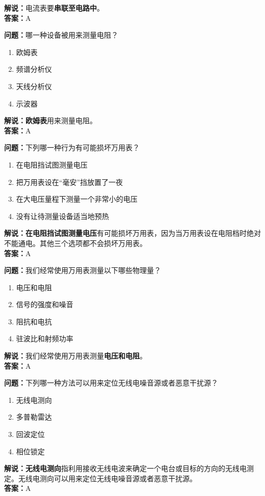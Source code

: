 \textbf{解说：}电流表要\textbf{串联至电路中}。\\\textbf{答案：}A%


\textbf{问题：}哪一种设备被用来测量电阻？

\begin{enumerate}[label=\Alph*), leftmargin=1cm]
	\item 欧姆表
	\item 频谱分析仪
	\item 天线分析仪
	\item 示波器
\end{enumerate}

\textbf{解说：欧姆表}用来测量电阻。\\\textbf{答案：}A


\textbf{问题：}下列哪一种行为有可能损坏万用表？

\begin{enumerate}[label=\Alph*), leftmargin=1cm]
	\item 在电阻挡试图测量电压
	\item 把万用表设在“毫安”挡放置了一夜
	\item 在大电压量程下测量一个非常小的电压
	\item 没有让待测量设备适当地预热
\end{enumerate}

\textbf{解说：在电阻挡试图测量电压}有可能损坏万用表，因为当万用表设在电阻档时绝对不能通电。其他三个选项都不会损坏万用表。\\\textbf{答案：}A%

\textbf{问题：}我们经常使用万用表测量以下哪些物理量？

\begin{enumerate}[label=\Alph*), leftmargin=1cm]
	\item 电压和电阻
	\item 信号的强度和噪音
	\item 阻抗和电抗
	\item 驻波比和射频功率
\end{enumerate}

\textbf{解说：}我们经常使用万用表测量\textbf{电压和电阻}。\\\textbf{答案：}A%


\textbf{问题：}下列哪一种方法可以用来定位无线电噪音源或者恶意干扰源？

\begin{enumerate}[label=\Alph*), leftmargin=1cm]
	\item 无线电测向
	\item 多普勒雷达
	\item 回波定位
	\item 相位锁定
\end{enumerate}

\textbf{解说：无线电测向}指利用接收无线电波来确定一个电台或目标的方向的无线电测定。无线电测向可以用来定位无线电噪音源或者恶意干扰源。\\\textbf{答案：}A%



